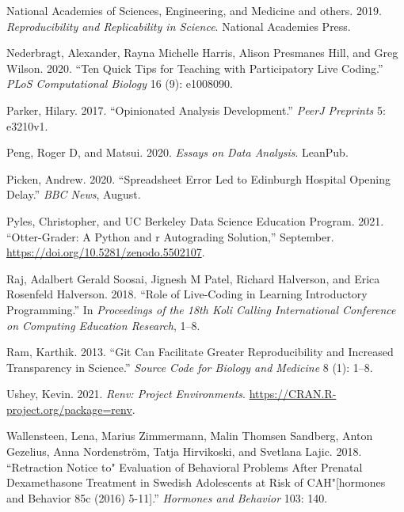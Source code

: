 \documentclass[
  12 pt,
]{paper}
\newlength{\cslhangindent}
\newlength{\cslentryspacingunit} %
\newenvironment{CSLReferences}[2] %
 {%
  \setlength{\parindent}{0pt}
  \ifodd #1
  \let\oldpar\par
  \def\par{\hangindent=\cslhangindent\oldpar}
  \fi
  \setlength{\parskip}{#2\cslentryspacingunit}
 }%
 {}
\begin{document}
\begin{CSLReferences}{1}{0}
\leavevmode{}%
National Academies of Sciences, Engineering, and Medicine and others. 2019. \emph{Reproducibility and Replicability in Science}. National Academies Press.

\leavevmode{}%
Nederbragt, Alexander, Rayna Michelle Harris, Alison Presmanes Hill, and Greg Wilson. 2020. {``Ten Quick Tips for Teaching with Participatory Live Coding.''} \emph{PLoS Computational Biology} 16 (9): e1008090.

\leavevmode{}%
Parker, Hilary. 2017. {``Opinionated Analysis Development.''} \emph{PeerJ Preprints} 5: e3210v1.

\leavevmode{}%
Peng, Roger D, and Matsui. 2020. \emph{Essays on Data Analysis}. LeanPub.

\leavevmode{}%
Picken, Andrew. 2020. {``Spreadsheet Error Led to {Edinburgh} Hospital Opening Delay.''} \emph{BBC News}, August.

\leavevmode{}%
Pyles, Christopher, and UC Berkeley Data Science Education Program. 2021. {``Otter-Grader: A Python and r Autograding Solution,''} September. \url{https://doi.org/10.5281/zenodo.5502107}.

\leavevmode{}%
Raj, Adalbert Gerald Soosai, Jignesh M Patel, Richard Halverson, and Erica Rosenfeld Halverson. 2018. {``Role of Live-Coding in Learning Introductory Programming.''} In \emph{Proceedings of the 18th Koli Calling International Conference on Computing Education Research}, 1--8.

\leavevmode{}%
Ram, Karthik. 2013. {``Git Can Facilitate Greater Reproducibility and Increased Transparency in Science.''} \emph{Source Code for Biology and Medicine} 8 (1): 1--8.

\leavevmode{}%
Ushey, Kevin. 2021. \emph{Renv: Project Environments}. \url{https://CRAN.R-project.org/package=renv}.

\leavevmode{}%
Wallensteen, Lena, Marius Zimmermann, Malin Thomsen Sandberg, Anton Gezelius, Anna Nordenström, Tatja Hirvikoski, and Svetlana Lajic. 2018. {``Retraction Notice to" Evaluation of Behavioral Problems After Prenatal Dexamethasone Treatment in Swedish Adolescents at Risk of CAH"{[}hormones and Behavior 85c (2016) 5-11{]}.''} \emph{Hormones and Behavior} 103: 140.


\end{CSLReferences}
\end{document}
